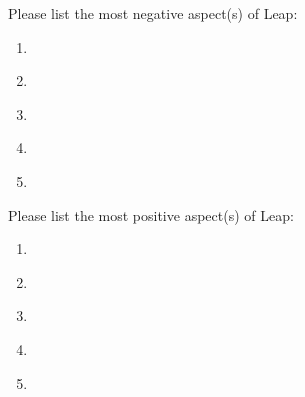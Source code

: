 Please list the most negative aspect(s) of Leap:

\begin{enumerate}

\item{   }

\item{   }

\item{   }

\item{   }

\item{   }


\end{enumerate}


Please list the most positive aspect(s) of Leap:

\begin{enumerate}

\item{   }

\item{   }

\item{   }

\item{   }

\item{   }


\end{enumerate}
